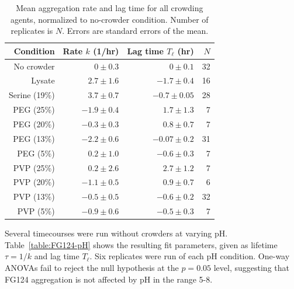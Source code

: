 

\begin{table}[b!]
\centering
  \caption[Aggregation rates and lag times for all crowding agents.]{Mean aggregation rate and lag time for all crowding agents, normalized to no-crowder condition. Number of replicates is $N$. Errors are standard errors of the mean.}
    \label{table:crowder-params}
    \begin{tabular}{r |r |r| r}%
       Condition & Rate $k$ (1/hr) & Lag time $T_\ell$ (hr)  & $N$ \\
      \hline
	No crowder & $0\pm0.3$ & $0\pm0.1$& 32\\
	Lysate & $2.7\pm1.6$  & $-1.7\pm0.4 $ & 16 \\
     	Serine (19\%)& $3.7\pm0.7$  & $-0.7\pm0.05  $& 28 \\
      	PEG (25\%) & $-1.9\pm0.4$  & $1.7\pm1.3  $ & 7 \\
     	PEG (20\%) & $-0.3\pm0.3$   & $0.8\pm0.7$  & 7 \\
	PEG (13\%) & $-2.2\pm 0.6$ & $-0.07\pm 0.2 $ & 31 \\
	PEG (5\%) & $0.2\pm1.0$  & $-0.6\pm0.3 $ & 7 \\
      	PVP (25\%) & $0.2\pm2.6$  & $2.7\pm1.2 $  & 7 \\
     	PVP (20\%) & $-1.1\pm0.5$  & $0.9\pm0.7$   & 6\\
	PVP (13\%) & $-0.5\pm0.5$  & $-0.6\pm0.2 $ & 32\\
	PVP (5\%) & $-0.9\pm0.6$  & $-0.5\pm0.3$   & 7 \\
    \end{tabular}
\end{table}

Several timecourses were run without crowders at varying pH.  Table~\ref{table:FG124-pH} shows the resulting fit parameters, given as lifetime $\tau = 1/k$ and lag time $T_\ell$.  Six replicates were run of each pH condition.  One-way ANOVAs fail to reject the null hypothesis at the $p=0.05$ level, suggesting that FG124 aggregation is not affected by pH in the range 5-8.

